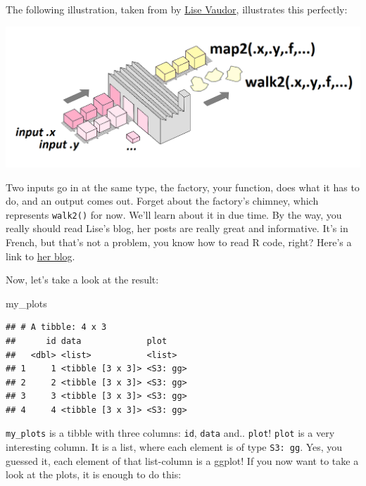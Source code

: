 \documentclass[]{gitbook}
\newenvironment{Shaded}{\begin{snugshade}}{\end{snugshade}}
\newcommand{\NormalTok}[1]{#1}
\newcommand{\OperatorTok}[1]{\textcolor[rgb]{0.81,0.36,0.00}{\textbf{#1}}}
\theoremstyle{definition}
\theoremstyle{definition}
\theoremstyle{definition}
\theoremstyle{remark}
\begin{document}
The following illustration, taken from \citet{vaudor_purrr_2018} by
\href{https://twitter.com/LVaudor}{Lise Vaudor}, illustrates this
perfectly:

\includegraphics[width=18.42in]{assets/purrr3}

Two inputs go in at the same type, the factory, your function, does what
it has to do, and an output comes out. Forget about the factory's
chimney, which represents \texttt{walk2()} for now. We'll learn about it
in due time. By the way, you really should read Lise's blog, her posts
are really great and informative. It's in French, but that's not a
problem, you know how to read R code, right? Here's a link to
\href{http://perso.ens-lyon.fr/lise.vaudor/}{her blog}.

Now, let's take a look at the result:

\begin{Shaded}
\begin{Highlighting}[]
\NormalTok{my_plots}
\end{Highlighting}
\end{Shaded}

\begin{verbatim}
## # A tibble: 4 x 3
##      id data             plot    
##   <dbl> <list>           <list>  
## 1     1 <tibble [3 x 3]> <S3: gg>
## 2     2 <tibble [3 x 3]> <S3: gg>
## 3     3 <tibble [3 x 3]> <S3: gg>
## 4     4 <tibble [3 x 3]> <S3: gg>
\end{verbatim}

\texttt{my\_plots} is a tibble with three columns: \texttt{id},
\texttt{data} and.. \texttt{plot}! \texttt{plot} is a very interesting
column. It is a list, where each element is of type \texttt{S3:\ gg}.
Yes, you guessed it, each element of that list-column is a ggplot! If
you now want to take a look at the plots, it is enough to do this:

\begin{Shaded}
\end{Shaded}
\end{document}
